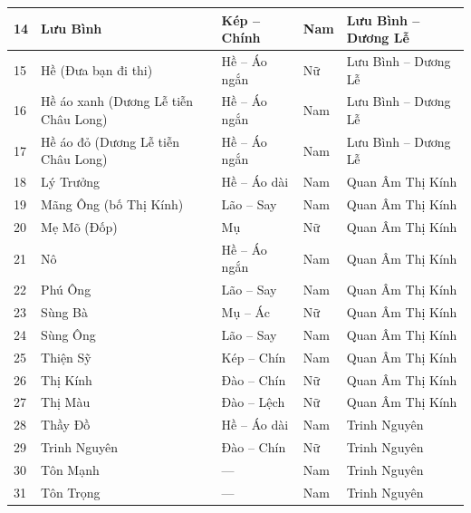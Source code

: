 \begin{longtable}{|p{0.6cm}|p{4.5cm}|p{3.0cm}|p{1.0cm}|p{4.4cm}|}
  14 & Lưu Bình                                 & Kép -- Chính   & Nam & Lưu Bình -- Dương Lễ  \\ \hline
  15 & Hề (Đưa bạn đi thi)                      & Hề -- Áo ngắn  & Nữ  & Lưu Bình -- Dương Lễ  \\ \hline
  16 & Hề áo xanh (Dương Lễ tiễn Châu Long)     & Hề -- Áo ngắn  & Nam & Lưu Bình -- Dương Lễ  \\ \hline
  17 & Hề áo đỏ (Dương Lễ tiễn Châu Long)       & Hề -- Áo ngắn  & Nam & Lưu Bình -- Dương Lễ  \\ \hline
  18 & Lý Trưởng                                & Hề -- Áo dài   & Nam & Quan Âm Thị Kính      \\ \hline
  19 & Mãng Ông (bố Thị Kính)                   & Lão -- Say     & Nam & Quan Âm Thị Kính      \\ \hline
  20 & Mẹ Mõ (Đốp)                              & Mụ             & Nữ  & Quan Âm Thị Kính      \\ \hline
  21 & Nô                                       & Hề -- Áo ngắn  & Nam & Quan Âm Thị Kính      \\ \hline
  22 & Phú Ông                                  & Lão -- Say     & Nam & Quan Âm Thị Kính      \\ \hline
  23 & Sùng Bà                                  & Mụ -- Ác       & Nữ  & Quan Âm Thị Kính      \\ \hline
  24 & Sùng Ông                                 & Lão -- Say     & Nam & Quan Âm Thị Kính      \\ \hline
  25 & Thiện Sỹ                                 & Kép -- Chín    & Nam & Quan Âm Thị Kính      \\ \hline
  26 & Thị Kính                                 & Đào -- Chín    & Nữ  & Quan Âm Thị Kính      \\ \hline
  27 & Thị Màu                                  & Đào -- Lệch    & Nữ  & Quan Âm Thị Kính      \\ \hline
  28 & Thầy Đồ                                  & Hề -- Áo dài   & Nam & Trinh Nguyên          \\ \hline
  29 & Trinh Nguyên                             & Đào -- Chín    & Nữ  & Trinh Nguyên          \\ \hline
  30 & Tôn Mạnh                                 & ---            & Nam & Trinh Nguyên          \\ \hline
  31 & Tôn Trọng                                & ---            & Nam & Trinh Nguyên          \\ \hline

\end{longtable}

